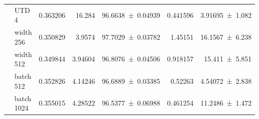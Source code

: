 {\begin{longtable}{@{}llrrrrr@{}}
     & UTD 4 & \num{0.363206} & \num{16.284} & \num{96.6638+-0.04939} & \num{0.441596} & \num{3.91695+-1.082} \\
     & width 256 & \num{0.350829} & \num{3.9574} & \num{97.7029+-0.03782} & \num{1.45151} & \num{16.1567+-6.238} \\
     & width 512 & \num{0.349844} & \num{3.94604} & \num{96.8076+-0.04506} & \num{0.918157} & \num{15.411+-5.851} \\
     & batch 512 & \num{0.352826} & \num{4.14246} & \num{96.6889+-0.03385} & \num{0.52263} & \num{4.54072+-2.838} \\
     & batch 1024 & \num{0.355015} & \num{4.28522} & \num{96.5377+-0.06988} & \num{0.461254} & \num{11.2486+-1.472} \\
  \end{longtable}
}

